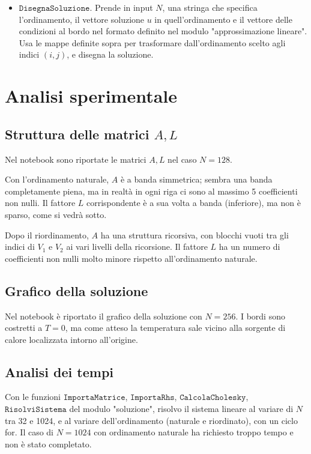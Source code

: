 \documentclass{article}
\begin{document}
\begin{itemize}
Questa funzione fa l'operazione inversa della funzione $\texttt{GeneraIndiciBordo}$ del modulo "approssimazione lineare", a meno del segno che lì era stato usato per distinguere tra punti di bordo e non.

\item $\texttt{DisegnaSoluzione}$.
Prende in input $N$, una stringa che specifica l'ordinamento, il vettore soluzione $u$ in quell'ordinamento e il vettore delle condizioni al bordo nel formato definito nel modulo "approssimazione lineare".
Usa le mappe definite sopra per trasformare dall'ordinamento scelto agli indici $(i,j)$, e disegna la soluzione.

\end{itemize}

\section{Analisi sperimentale}
\subsection{Struttura delle matrici $A,L$}
Nel notebook sono riportate le matrici $A,L$ nel caso $N=128$.

Con l'ordinamento naturale, $A$ è a banda simmetrica; sembra una banda completamente piena, ma in realtà in ogni riga ci sono al massimo 5 coefficienti non nulli.
Il fattore $L$ corrispondente è a sua volta a banda (inferiore), ma non è sparso, come si vedrà sotto.

Dopo il riordinamento, $A$ ha una struttura ricorsiva, con blocchi vuoti tra gli indici di $V_1$ e $V_2$ ai vari livelli della ricorsione.
Il fattore $L$ ha un numero di coefficienti non nulli molto minore rispetto all'ordinamento naturale.

\subsection{Grafico della soluzione}
Nel notebook è riportato il grafico della soluzione con $N=256$.
I bordi sono costretti a $T=0$, ma come atteso la temperatura sale vicino alla sorgente di calore localizzata intorno all'origine.

\subsection{Analisi dei tempi}
Con le funzioni $\texttt{ImportaMatrice}$, $\texttt{ImportaRhs}$, $\texttt{CalcolaCholesky}$, $\texttt{RisolviSistema}$ del modulo "soluzione", risolvo il sistema lineare al variare di $N$ tra 32 e 1024, e al variare dell'ordinamento (naturale e riordinato), con un ciclo for.
Il caso di $N=1024$ con ordinamento naturale ha richiesto troppo tempo e non è stato completato.
\end{document}
